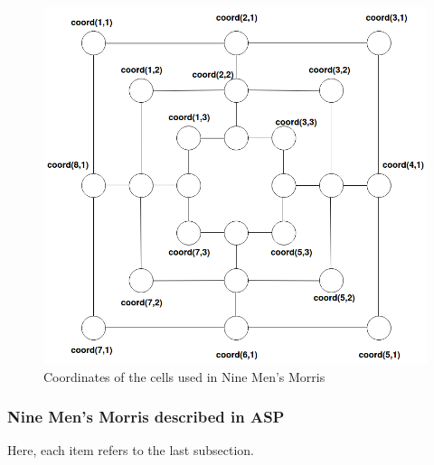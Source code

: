 \documentclass[12pt,twoside]{report}
\begin{document}
\begin{figure}[h]
\centering
\includegraphics[width = 0.8\hsize]{9MM_coord.png}
\caption{Coordinates of the cells used in Nine Men's Morris}
\label{fig:9MM_coord}
\end{figure}

\subsubsection{Nine Men's Morris described in ASP}

Here, each item refers to the last subsection.
\end{document}
